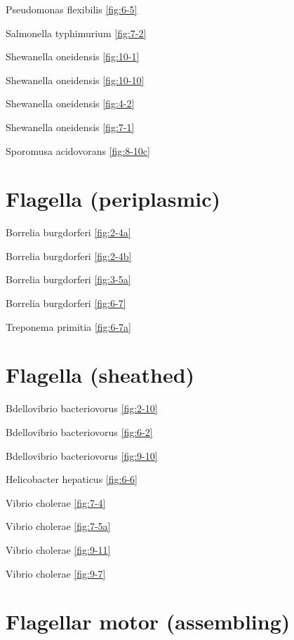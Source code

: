 \documentclass[]{tufte-book}
\begin{document}
Pseudomonas flexibilis \ref{fig:6-5}

Salmonella typhimurium \ref{fig:7-2}

Shewanella oneidensis \ref{fig:10-1}

Shewanella oneidensis \ref{fig:10-10}

Shewanella oneidensis \ref{fig:4-2}

Shewanella oneidensis \ref{fig:7-1}

Sporomusa acidovorans \ref{fig:8-10c}

\hypertarget{flagella-periplasmic}{%
\section*{Flagella (periplasmic)}\label{flagella-periplasmic}}

Borrelia burgdorferi \ref{fig:2-4a}

Borrelia burgdorferi \ref{fig:2-4b}

Borrelia burgdorferi \ref{fig:3-5a}

Borrelia burgdorferi \ref{fig:6-7}

Treponema primitia \ref{fig:6-7a}

\hypertarget{flagella-sheathed}{%
\section*{Flagella (sheathed)}\label{flagella-sheathed}}

Bdellovibrio bacteriovorus \ref{fig:2-10}

Bdellovibrio bacteriovorus \ref{fig:6-2}

Bdellovibrio bacteriovorus \ref{fig:9-10}

Helicobacter hepaticus \ref{fig:6-6}

Vibrio cholerae \ref{fig:7-4}

Vibrio cholerae \ref{fig:7-5a}

Vibrio cholerae \ref{fig:9-11}

Vibrio cholerae \ref{fig:9-7}

\hypertarget{flagellar-motor-assembling}{%
\section*{Flagellar motor (assembling)}\label{flagellar-motor-assembling}}
\end{document}
